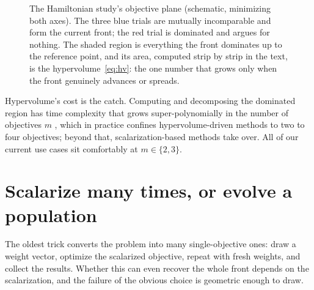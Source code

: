 \begin{figure}[t]
\centering
{}
\caption{The Hamiltonian study's objective plane (schematic, minimizing
both axes). The three blue trials are mutually incomparable and form the
current front; the red trial is dominated and argues for nothing. The
shaded region is everything the front dominates up to the reference
point, and its area, computed strip by strip in the text, is the
hypervolume~\eqref{eq:hv}: the one number that grows only when the front
genuinely advances or spreads.}
\label{fig:pareto}
\end{figure}

Hypervolume's cost is the catch. Computing and decomposing the dominated
region has time complexity that grows super-polynomially in the number of
objectives $m$ \citep{daulton2021qnehvi}, which in practice confines
hypervolume-driven methods to two to four objectives; beyond that,
scalarization-based methods take over. All of our current use cases sit
comfortably at $m \in \{2, 3\}$.

\section{Scalarize many times, or evolve a population}

The oldest trick converts the problem into many single-objective ones:
draw a weight vector, optimize the scalarized objective, repeat with
fresh weights, and collect the results. Whether this can even recover the
whole front depends on the scalarization, and the failure of the obvious
choice is geometric enough to draw.

